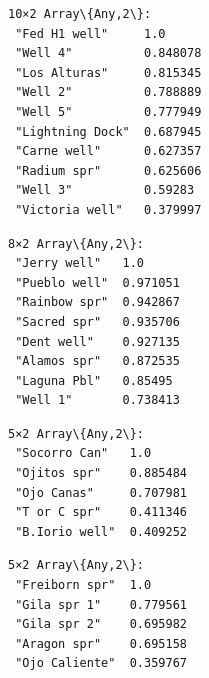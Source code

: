 \documentclass[11pt]{article}
\begin{document}
    \begin{Verbatim}[commandchars=\\\{\}]
10×2 Array\{Any,2\}:
 "Fed H1 well"     1.0
 "Well 4"          0.848078
 "Los Alturas"     0.815345
 "Well 2"          0.788889
 "Well 5"          0.777949
 "Lightning Dock"  0.687945
 "Carne well"      0.627357
 "Radium spr"      0.625606
 "Well 3"          0.59283
 "Victoria well"   0.379997
    \end{Verbatim}

    
    
    \begin{Verbatim}[commandchars=\\\{\}]
8×2 Array\{Any,2\}:
 "Jerry well"   1.0
 "Pueblo well"  0.971051
 "Rainbow spr"  0.942867
 "Sacred spr"   0.935706
 "Dent well"    0.927135
 "Alamos spr"   0.872535
 "Laguna Pbl"   0.85495
 "Well 1"       0.738413
    \end{Verbatim}

    
    
    \begin{Verbatim}[commandchars=\\\{\}]
5×2 Array\{Any,2\}:
 "Socorro Can"   1.0
 "Ojitos spr"    0.885484
 "Ojo Canas"     0.707981
 "T or C spr"    0.411346
 "B.Iorio well"  0.409252
    \end{Verbatim}

    
    
    \begin{Verbatim}[commandchars=\\\{\}]
5×2 Array\{Any,2\}:
 "Freiborn spr"  1.0
 "Gila spr 1"    0.779561
 "Gila spr 2"    0.695982
 "Aragon spr"    0.695158
 "Ojo Caliente"  0.359767
    \end{Verbatim}

    
    \begin{center}
    \end{center}
    { \hspace*{\fill} \\}
    
\end{document}
